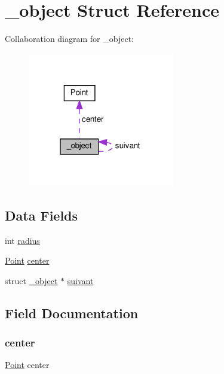 \hypertarget{struct__object}{}\section{\+\_\+object Struct Reference}
\label{struct__object}


Collaboration diagram for \+\_\+object\+:\nopagebreak
\begin{figure}[H]
\begin{center}
\leavevmode
\includegraphics[width=181pt]{struct__object__coll__graph}
\end{center}
\end{figure}
\subsection*{Data Fields}
\begin{DoxyCompactItemize}
\item 
int \hyperlink{struct__object_a395279899207ce7f17adf9fdb8ee97ee}{radius}
\item 
\hyperlink{struct_point}{Point} \hyperlink{struct__object_a24bb1c337bce91dd3e7a4a4372b11793}{center}
\item 
struct \hyperlink{struct__object}{\+\_\+object} $\ast$ \hyperlink{struct__object_afb085435a094e9028d6ab3915166b2f3}{suivant}
\end{DoxyCompactItemize}


\subsection{Field Documentation}
\mbox{\label{struct__object_a24bb1c337bce91dd3e7a4a4372b11793}} 
\subsubsection{\texorpdfstring{center}{center}}
{\footnotesize\ttfamily \hyperlink{struct_point}{Point} center}

